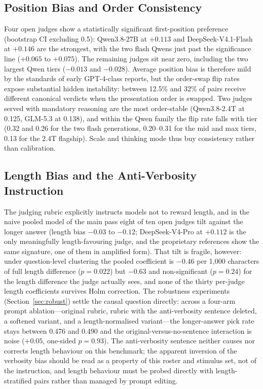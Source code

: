 \documentclass[review,12pt]{elsarticle}
\begin{document}
\subsection{Position Bias and Order Consistency}
\label{sec:res-pb}

Four open judges show a statistically significant first-position preference
(bootstrap CI excluding 0.5): Qwen3.8-27B at $+0.113$ and
DeepSeek-V4.1-Flash at $+0.146$ are the strongest, with the two flash Qwens
just past the significance line ($+0.065$ to $+0.075$). The remaining
judges sit near zero, including the two largest Qwen tiers
($-0.013$ and $-0.028$). Average position bias is therefore mild by the
standards of early GPT-4-class reports, but the order-swap flip rates
expose substantial hidden instability: between 12.5\% and 32\% of pairs
receive different canonical verdicts when the presentation order is
swapped. Two judges served with mandatory reasoning are the most
order-stable (Qwen3.8-2.4T at 0.125, GLM-5.3 at 0.138), and within the
Qwen family the flip rate falls with tier (0.32 and 0.26 for the two
flash generations, 0.20--0.31 for the mid and max tiers, 0.13 for the
2.4T flagship). Scale and
thinking mode thus buy consistency rather than calibration.

\subsection{Length Bias and the Anti-Verbosity Instruction}
\label{sec:res-lb}

The judging rubric explicitly instructs models not to reward length, and
in the naive pooled model of the main pass eight of ten open judges tilt
against the longer answer (length bias $-0.03$ to $-0.12$;
DeepSeek-V4-Pro at $+0.112$ is the only meaningfully length-favouring
judge, and the proprietary references show the same signature, one of them
in amplified form). That tilt is fragile, however: under question-level
clustering the pooled coefficient is $-0.46$ per 1{,}000 characters of
full length difference ($p=0.022$) but $-0.63$ and non-significant
($p=0.24$) for the length difference the judge actually sees, and none of
the thirty per-judge length coefficients survives Holm correction. The
robustness experiments (Section~\ref{sec:robust}) settle the causal
question directly: across a four-arm prompt ablation---original rubric,
rubric with the anti-verbosity sentence deleted, a softened variant, and a
length-normalised variant---the longer-answer pick rate stays between
0.476 and 0.490 and the original-versus-no-sentence interaction is noise
($+0.05$, one-sided $p=0.93$). The anti-verbosity sentence neither causes
nor corrects length behaviour on this benchmark; the apparent inversion of
the verbosity bias should be read as a property of this roster and
stimulus set, not of the instruction, and length behaviour must be probed
directly with length-stratified pairs rather than managed by prompt
editing.
\end{document}
